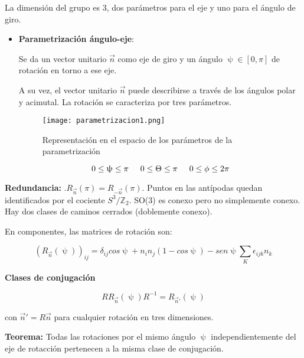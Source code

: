\documentclass{article}
\begin{document}
    La dimensión del grupo es 3, dos parámetros para el eje y uno para el ángulo de giro.

    \begin{itemize}
        \item \textbf{Parametrización ángulo-eje}:

        Se da un vector unitario $\Vec{n}$ como eje de giro y un ángulo $\uppsi \in [0,\pi]$ de rotación en torno a ese eje.

        A su vez, el vector unitario $\Vec{n}$ puede describirse a través de los ángulos polar y acimutal. La rotación se caracteriza por tres parámetros.


        \begin{figure}[h!]
            \centering
            \texttt{[image: parametrizacion1.png]}
            \caption{Representación en el espacio de los parámetros de la parametrización}
            \label{fig:my_label}
        \end{figure}

    $$0\leq \uppsi \leq \pi \hspace{0.5cm} 0\leq \Theta \leq \pi \hspace{0.5cm}  0\leq \phi \leq 2\pi $$

        \end{itemize}
        \textbf{Redundancia:} .$R_{\Vec{n}}(\pi) = R_{-\Vec{n}}(\pi) $. Puntos en las antípodas quedan identificados por el cociente $S^3/\mathds{Z}_2$. SO(3) es conexo pero no simplemente conexo. Hay dos clases de caminos cerrados (doblemente conexo).

         En componentes, las matrices de rotación son:

        $$(R_{\Vec{n}}(\uppsi))_{ij}=\delta _{ij} cos \uppsi + n_in_j (1-cos \uppsi) - sen \uppsi \sum _K \epsilon _{ijk} n_k$$

        \newpage
        \textbf{Clases de conjugación}

        $$RR_{\Vec{n}}(\uppsi ) R^{-1} = R_{\Vec{n}'}(\uppsi)$$

        con $\Vec{n}'=R\Vec{n}$ para cualquier rotación en tres dimensiones.

        \smallskip
        \textbf{Teorema:} Todas las rotaciones por el mismo ángulo $\uppsi$ independientemente del eje de rotacción pertenecen a la misma clase de conjugación.
\end{document}
